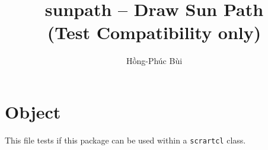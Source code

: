 \documentclass{scrartcl}
\title{
  \textsf{sunpath} -- Draw Sun Path\\
  (Test Compatibility only)
}%
\author{%
 Hồng-Phúc Bùi%
}
\begin{document}
%
\parindent0pt
%
\maketitle
\tableofcontents

\section{Object}

This file tests if this package can be used within a \texttt{scrartcl} class.


\end{document}
